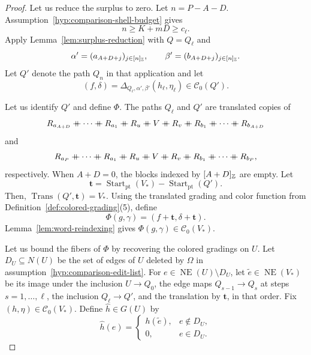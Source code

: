 \begin{proof}
Let us reduce the surplus to zero.
Let $n=P-A-D$.
Assumption~\ref{hyp:comparison-shell-budget} gives
\[
 n\ge K+mD\ge c_\ell.
\]
Apply Lemma~\ref{lem:surplus-reduction} with $Q=Q_\ell$ and
\[
 \alpha'=(a_{A+D+j})_{j\in[n]_{\mathbb Z}},\qquad
 \beta'=(b_{A+D+j})_{j\in[n]_{\mathbb Z}}.
\]
Let $Q'$ denote the path $Q_n$ in that application and let
\[
 (f,\delta)=\Delta_{Q_\ell,\alpha',\beta'}(h_\ell,\eta_\ell)
 \in\mathcal C_0(Q').
\]

Let us identify $Q'$ and define $\Phi$.
The paths $Q_\ell$ and $Q'$ are translated copies of
\[
 R_{a_{A+D}}\ccn \cdots\ccn R_{a_1}\ccn R_u\ccn V\ccn R_v\ccn R_{b_1}\ccn \cdots\ccn R_{b_{A+D}}
\]
and
\[
 R_{a_P}\ccn \cdots\ccn R_{a_1}\ccn R_u\ccn V\ccn R_v\ccn R_{b_1}\ccn \cdots\ccn R_{b_P},
\]
respectively. When $A+D=0$, the blocks indexed by $[A+D]_{\mathbb Z}$ are empty.
Let
\[
 \mathbf t=\operatorname{Start}_{\mathrm{pt}}(V_*)-
             \operatorname{Start}_{\mathrm{pt}}(Q').
\]
Then, $\operatorname{Trans}(Q',\mathbf t)=V_*$.
Using the translated grading and color function from
Definition~\ref{def:colored-grading}(5), define
\[
 \Phi(g,\gamma)=(f+\mathbf t,\delta+\mathbf t).
\]
Lemma~\ref{lem:word-reindexing} gives $\Phi(g,\gamma)\in\mathcal C_0(V_*)$.

Let us bound the fibers of $\Phi$ by recovering the colored gradings on $U$.
Let $D_U\subseteq N(U)$ be the set of edges of $U$ deleted by $\Omega$ in assumption~\ref{hyp:comparison-edit-list}.
For $e\in\operatorname{NE}(U)\setminus D_U$, let $\widetilde e\in\operatorname{NE}(V_*)$ be its image under the inclusion $U\to Q_0$, the edge maps $Q_{s-1}\to Q_s$ at steps $s=1,\ldots,\ell$, the inclusion $Q_\ell\to Q'$, and the translation by $\mathbf t$, in that order.
Fix $(h,\eta)\in\mathcal C_0(V_*)$.
Define $\widehat h\in G(U)$ by
\[
 \widehat h(e)=
 \begin{cases}
 h(\widetilde e),& e\notin D_U,\\
 0,& e\in D_U.
 \end{cases}
\]


\end{proof}
